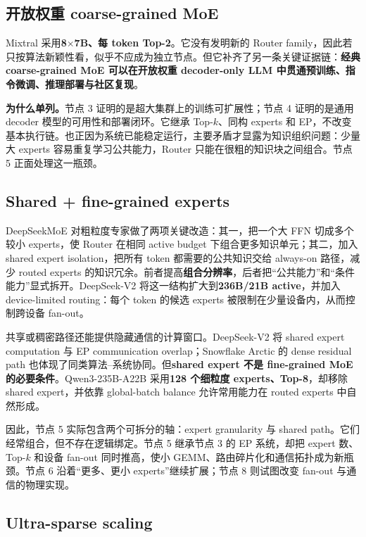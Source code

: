 \documentclass[10pt,a4paper,fontset=none]{ctexart}
\newcommand{\term}[1]{\textbf{#1}}
\begin{document}
\subsection{开放权重 coarse-grained MoE}

Mixtral 采用\textbf{8$\times$7B、每 token Top-2}\cite{jiang2024mixtral}。它没有发明新的 Router family，因此若只按算法新颖性看，似乎不应成为独立节点。但它补齐了另一条关键证据链：\term{经典 coarse-grained MoE 可以在开放权重 decoder-only LLM 中贯通预训练、指令微调、推理部署与社区复现}。

\textbf{为什么单列。}节点 3 证明的是超大集群上的训练可扩展性；节点 4 证明的是通用 decoder 模型的可用性和部署闭环。它继承 Top-$k$、同构 experts 和 EP，不改变基本执行链。也正因为系统已能稳定运行，主要矛盾才显露为知识组织问题：少量大 experts 容易重复学习公共能力，Router 只能在很粗的知识块之间组合。节点 5 正面处理这一瓶颈。

\subsection{Shared + fine-grained experts}

DeepSeekMoE 对粗粒度专家做了两项关键改造\cite{dai2024deepseekmoe}：其一，把一个大 FFN 切成多个较小 experts，使 Router 在相同 active budget 下组合更多知识单元；其二，加入 shared expert isolation，把所有 token 都需要的公共知识交给 always-on 路径，减少 routed experts 的知识冗余。前者提高\term{组合分辨率}，后者把“公共能力”和“条件能力”显式拆开。DeepSeek-V2 将这一结构扩大到\textbf{236B/21B active}，并加入 device-limited routing：每个 token 的候选 experts 被限制在少量设备内，从而控制跨设备 fan-out\cite{deepseekv2}。

共享或稠密路径还能提供隐藏通信的计算窗口。DeepSeek-V2 将 shared expert computation 与 EP communication overlap；Snowflake Arctic 的 dense residual path 也体现了同类算法--系统协同\cite{snowflakearctic}。但\term{shared expert 不是 fine-grained MoE 的必要条件}。Qwen3-235B-A22B 采用\textbf{128 个细粒度 experts、Top-8}，却移除 shared expert，并依靠 global-batch balance 允许常用能力在 routed experts 中自然形成\cite{qwen3}。

因此，节点 5 实际包含两个可拆分的轴：expert granularity 与 shared path。它们经常组合，但不存在逻辑绑定。节点 5 继承节点 3 的 EP 系统，却把 expert 数、Top-$k$ 和设备 fan-out 同时推高，使小 GEMM、路由碎片化和通信拓扑成为新瓶颈。节点 6 沿着“更多、更小 experts”继续扩展；节点 8 则试图改变 fan-out 与通信的物理实现。

\subsection{Ultra-sparse scaling}
\end{document}
